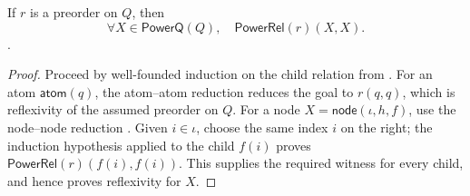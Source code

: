 \begin{lemma}
If $r$ is a preorder on $Q$, then
\[
\forall X\in\mathsf{PowerQ}(Q),\quad
\mathsf{PowerRel}(r)(X,X).
\].
\end{lemma}
\begin{proof}
Proceed by well-founded induction on the child relation from
.  For an atom $\mathsf{atom}(q)$, the
atom--atom reduction  reduces the goal to
$r(q,q)$, which is reflexivity of the assumed preorder on $Q$.  For a node
$X=\mathsf{node}(\iota,h,f)$, use the node--node reduction
.  Given $i\in\iota$, choose the same index $i$ on
the right; the induction hypothesis applied to the child $f(i)$ proves
$\mathsf{PowerRel}(r)(f(i),f(i))$.  This supplies the required witness for
every child, and hence proves reflexivity for $X$.
\end{proof}
